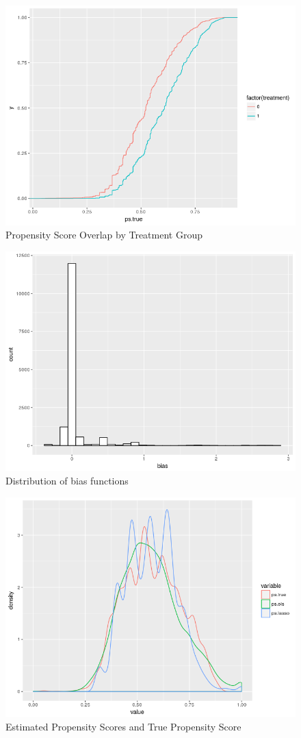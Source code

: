 \documentclass{article}
\begin{document}
\begin{figure}
\label{ol}
\center
\caption{Propensity Score Overlap by Treatment Group}
\includegraphics[scale=1]{overlap.png}
\end{figure}

\begin{figure}
\label{bias}
\center
\caption{Distribution of bias functions}
\includegraphics[scale=1]{bias.png}
\end{figure}

\begin{figure}
\label{pscores}
\center
\caption{Estimated Propensity Scores and True Propensity Score}
\includegraphics[scale=1]{pscore_ests.png}
\end{figure}
\end{document}
